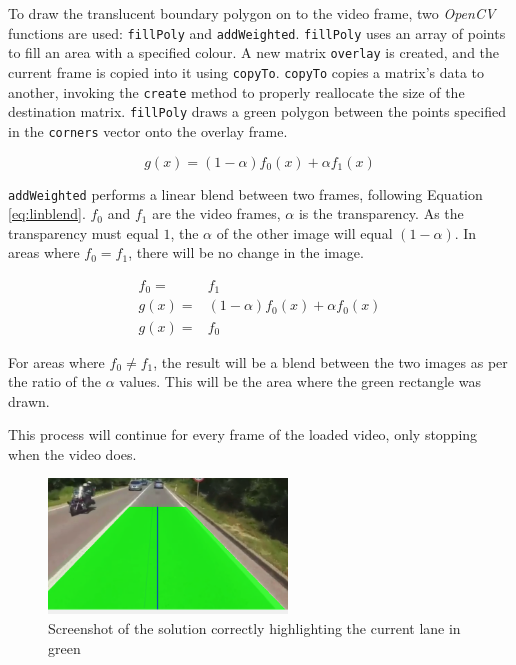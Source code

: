 \documentclass[conference]{IEEEtran}
\begin{document}
To draw the translucent boundary polygon on to the video frame, two \textit{OpenCV} functions are used: \verb|fillPoly| and \verb|addWeighted|. \verb|fillPoly| uses an array of points to fill an area with a specified colour\cite{fillPoly}. A new matrix \verb|overlay| is created, and the current frame is copied into it using \verb|copyTo|. \verb|copyTo| copies a matrix's data to another, invoking the \verb|create| method to properly reallocate the size of the destination matrix\cite{copyTo}. \verb|fillPoly| draws a green polygon between the points specified in the \verb|corners| vector onto the overlay frame.

\begin{equation}\label{eq:linblend}
g(x) = (1-\alpha)f_0(x)+\alpha f_1 (x)
\end{equation}

\verb|addWeighted| performs a linear blend between two frames, following Equation \ref{eq:linblend}. $f_0$ and $f_1$ are the video frames, $\alpha$ is the transparency. As the transparency must equal $1$, the $\alpha$ of the other image will equal $(1-\alpha)$. In areas where $f_0 = f_1$, there will be no change in the image.

\begin{equation}\label{xx}
\begin{split}
f_0=& f_1\\
g(x)=&(1-\alpha)f_0(x)+\alpha f_0 (x) \\
g(x)=& f_0 
\end{split}
\end{equation}

For areas where $f_0 \neq f_1$, the result will be a blend between the two images as per the ratio of the $\alpha$ values. This will be the area where the green rectangle was drawn.

This process will continue for every frame of the loaded video, only stopping when the video does.

\begin{figure}[H]
\centering
\includegraphics[width=2.5in]{video1_screenshot}
\caption{Screenshot of the solution correctly highlighting the current lane in green}
\label{fig:t5working}
\end{figure}
\end{document}
